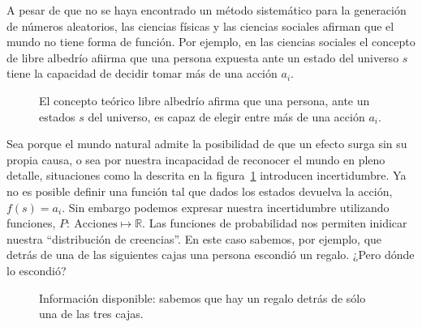 \documentclass[a4paper,10pt]{book}
\begin{document}
 A pesar de que no se haya encontrado un método sistemático para la generación de números aleatorios, las ciencias físicas y las ciencias sociales afirman que el mundo no tiene forma de función.
 Por ejemplo, en las ciencias sociales el concepto de libre albedrío afiirma que una persona expuesta ante un estado del universo $s$ tiene la capacidad de decidir tomar más de una acción $a_i$.
 \begin{figure}[ht!]
\centering
    \caption{El concepto teórico libre albedrío afirma que una persona, ante un estados $s$ del universo, es capaz de elegir entre más de una acción $a_i$.}
    \label{fig:libre_albedrio}
\end{figure}
%
Sea porque el mundo natural admite la posibilidad de que un efecto surga sin su propia causa, o sea por nuestra incapacidad de reconocer el mundo en pleno detalle, situaciones como la descrita en la figura~\ref{fig:libre_albedrio} introducen incertidumbre.
%
Ya no es posible definir una función tal que dados los estados devuelva la acción, $f(s) = a_i$.
%
Sin embargo podemos expresar nuestra incertidumbre utilizando funciones, $P : \ \text{Acciones} \mapsto \mathbb{R}$.
%
Las funciones de probabilidad nos permiten inidicar nuestra ``distribución de creencias''.
%
En este caso sabemos, por ejemplo, que detrás de una de las siguientes cajas una persona escondió un regalo.
%
¿Pero dónde lo escondió?
%
\begin{figure}[H]     
 \centering
 \caption{Información disponible: sabemos que hay un regalo detrás de sólo una de las tres cajas.}
 \label{fig:espacio_de_hipotesis}
\end{figure}
\end{document}
